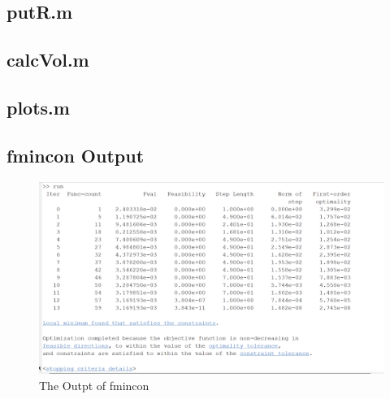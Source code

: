 \documentclass[11pt]{article}%
\begin{document}
\subsection{putR.m}
\label{sec:putR}

\newpage
\subsection{calcVol.m}
\label{sec:calcVol}

\newpage
\subsection{plots.m}
\label{sec:plots}

\subsection{fmincon Output}
\label{sec:fincon}
\begin{figure}[h!]
    \centering
    \includegraphics[width=0.75\linewidth]{fminconoutput.png}
    \caption{ The Outpt of fmincon }
    \label{fig:fmincon}
\end{figure}
\end{document}
